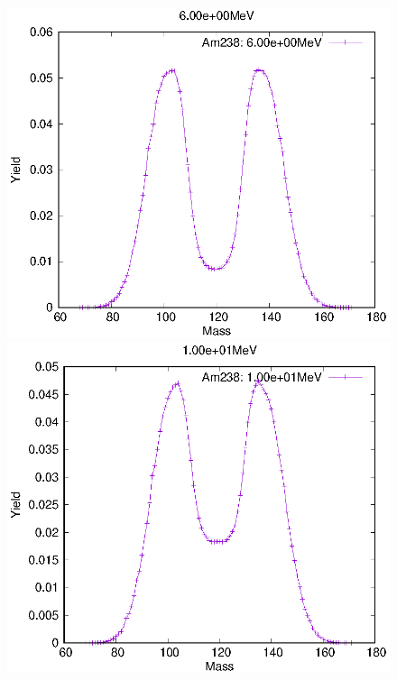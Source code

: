 \begin{figure}[htbp]
 \begin{minipage}{0.33\textwidth} \begin{center} \includegraphics[width=\textwidth]{YA/Am238_6.00e+00.eps} \end{center} \end{minipage}
\begin{minipage}{0.33\textwidth} \begin{center} \includegraphics[width=\textwidth]{YA/Am238_1.00e+01.eps} \end{center} \end{minipage}

\end{figure}

